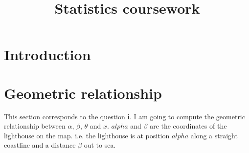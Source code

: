 \documentclass[12pt,a4paper]{article}
\newcommand{\topic}{Statistics coursework}
\begin{document}
\title{\topic}
\begin{titlepage}
    \maketitle
\end{titlepage}

\tableofcontents

\newpage
\begin{abstract}
\noindent
\end{abstract}

\section{Introduction}
\section{Geometric relationship}
This section corresponds to the question \textbf{i}. I am going to compute the geometric relationship between $\alpha$, $\beta$, $\theta$ and $x$.
$alpha$ and $\beta$ are the coordinates of the lighthouse on the map. i.e. the lighthouse is at position $alpha$ along a straight coastline and a distance $\beta$  out to sea. 
\end{document}
